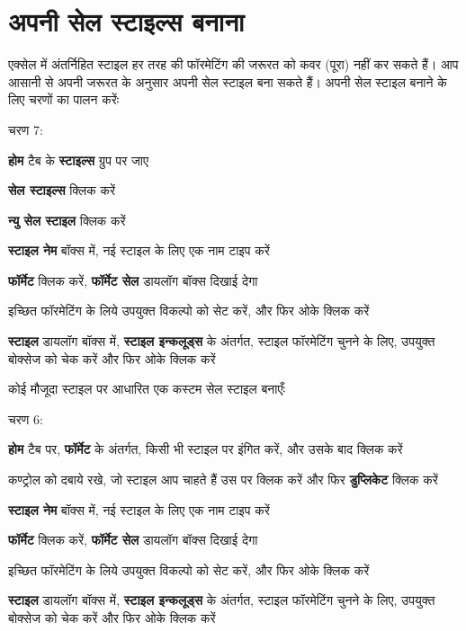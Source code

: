 \newpage

\section{अपनी सेल स्टाइल्स बनाना}\label{id-sec2.11}

एक्सेल में अंतर्निहित स्टाइल हर तरह की फॉरमेटिंग की जरूरत को कवर (पूरा) नहीं कर सकते हैं। आप आसानी से अपनी जरूरत के अनुसार अपनी सेल स्टाइल बना सकते हैं। अपनी सेल स्टाइल बनाने के लिए चरणों का पालन करेंः
\begin{descriptionSimple}{चरण 7:}
\item[चरण 1] \textbf{होम} टैब के \textbf{स्टाइल्स} ग्रुप पर जाए
\item[चरण 2] \textbf{सेल स्टाइल्स} क्लिक करें
\item[चरण 3] \textbf{न्यु सेल स्टाइल} क्लिक करें
\item[चरण 4] \textbf{स्टाइल नेम} बॉक्स में, नई स्टाइल के लिए एक नाम टाइप करें
\item[चरण 5] \textbf{फॉर्मेट} क्लिक करें, \textbf{फॉर्मेट सेल} डायलॉग बॉक्स दिखाई देगा
\item[चरण 6] इच्छित फॉरमेटिंग के लिये उपयुक्त विकल्पो को सेट करें, और फिर ओके क्लिक करें
\item[चरण 7] \textbf{स्टाइल} डायलॉग बॉक्स में, \textbf{स्टाइल इन्कलूड्स} के अंतर्गत, स्टाइल फॉरमेटिंग चुनने के लिए, उपयुक्त बोक्सेज को चेक करें और फिर ओके क्लिक करें
\end{descriptionSimple}
कोई मौजूदा स्टाइल पर आधारित एक कस्टम सेल स्टाइल बनाएँः
\begin{descriptionSimple}{चरण 6:}
\item[चरण 1] \textbf{होम} टैब पर, \textbf{फॉर्मेट} के अंतर्गत, किसी भी स्टाइल पर इंगित करें, और उसके बाद क्लिक करें
\item[चरण 2] कण्ट्रोल को दबाये रखे, जो स्टाइल आप चाहते हैं उस पर क्लिक करें और फिर \textbf{डुप्लिकेट} क्लिक करें
\item[चरण 3] \textbf{स्टाइल नेम} बॉक्स में, नई स्टाइल के लिए एक नाम टाइप करें
\item[चरण 4] \textbf{फॉर्मेट} क्लिक करें, \textbf{फॉर्मेट सेल} डायलॉग बॉक्स दिखाई देगा
\item[चरण 5] इच्छित फॉरमेटिंग के लिये उपयुक्त विकल्पो को सेट करें, और फिर ओके क्लिक करें
\item[चरण 6] \textbf{स्टाइल} डायलॉग बॉक्स में, \textbf{स्टाइल इन्कलूड्स} के अंतर्गत, स्टाइल फॉरमेटिंग चुनने के लिए, उपयुक्त बोक्सेज को चेक करें और फिर ओके क्लिक करें
\end{descriptionSimple}

